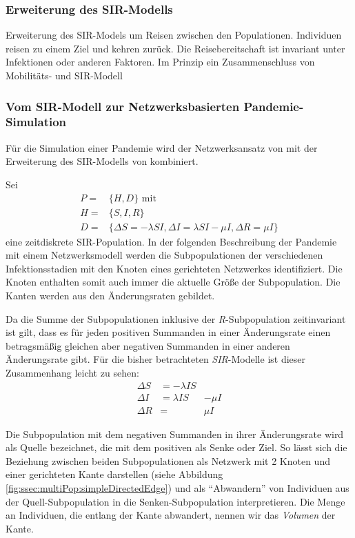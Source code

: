 \subsubsection{Erweiterung des SIR-Modells}
\cite{Sattenspiel1995} Erweiterung des SIR-Models um Reisen zwischen den Populationen. Individuen reisen zu einem Ziel und kehren zurück. Die Reisebereitschaft ist invariant unter Infektionen oder anderen Faktoren. Im Prinzip ein Zusammenschluss von Mobilitäts- und SIR-Modell

\subsubsection{Vom SIR-Modell zur Netzwerksbasierten Pandemie-Simulation}
Für die Simulation einer Pandemie wird der Netzwerksansatz von \citep{Capasso1978} mit der Erweiterung des SIR-Modells von \citep{Sattenspiel1995} kombiniert. 

Sei 
\begin{align}
	P=&\lbrace H, D\rbrace \text{ mit}\label{eq:ssec:multiPop:SIRBegin}\\
	H=&\lbrace S, I, R\rbrace\\
	D=&\lbrace \Delta S= -\lambda SI, \Delta I = \lambda SI - \mu I, \Delta R = \mu I   \rbrace \label{eq:ssec:multiPop:SIREnd}
\end{align}
eine zeitdiskrete SIR-Population. In der folgenden Beschreibung der Pandemie mit einem Netzwerksmodell werden die Subpopulationen der verschiedenen Infektionsstadien mit den Knoten eines gerichteten Netzwerkes identifiziert. Die Knoten enthalten somit auch immer die aktuelle Größe der Subpopulation. Die Kanten werden aus den Änderungsraten gebildet. 

Da die Summe der Subpopulationen inklusive der \emph{R}-Subpopulation zeitinvariant ist gilt, dass es für jeden positiven Summanden in einer Änderungsrate einen betragsmäßig gleichen aber negativen Summanden in einer anderen Änderungsrate gibt. Für die bisher betrachteten \emph{SIR}-Modelle ist dieser Zusammenhang leicht zu sehen:
\begin{align}
	\Delta S & = -\lambda IS & \\
	\Delta I & = \lambda IS & - \mu I \\
	\Delta R & = & \mu I
\end{align}

Die Subpopulation mit dem negativen Summanden in ihrer Änderungsrate wird als Quelle bezeichnet, die mit dem positiven als Senke oder Ziel. So lässt sich die Beziehung zwischen beiden Subpopulationen als Netzwerk mit 2 Knoten und einer gerichteten Kante darstellen (siehe Abbildung \ref{fig:ssec:multiPop:simpleDirectedEdge}) und als ``Abwandern'' von Individuen aus der Quell-Subpopulation in die Senken-Subpopulation interpretieren. Die Menge an Individuen, die entlang der Kante abwandert, nennen wir das \emph{Volumen} der Kante. 

